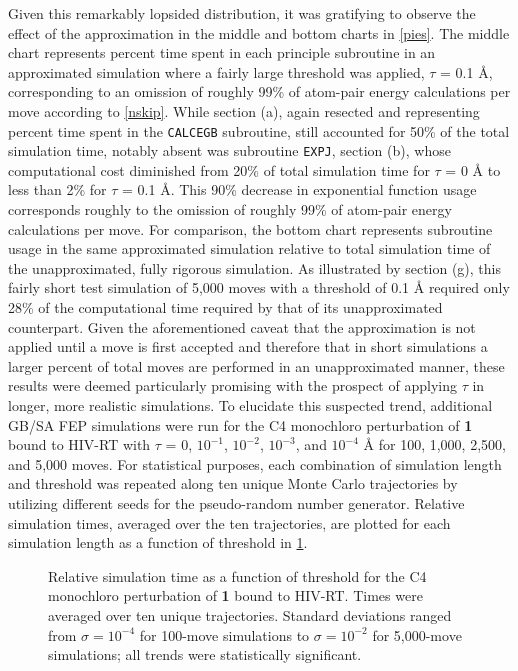 \documentclass[12pt]{report}
\begin{document}
Given this remarkably lopsided distribution, it was gratifying to observe the effect of the approximation in the middle and bottom charts in \cref{pies}. The middle chart represents percent time spent in each principle subroutine in an approximated simulation where a fairly large threshold was applied, $\tau$ = 0.1 \AA, corresponding to an omission of roughly 99\% of atom-pair energy calculations per move according to \cref{nskip}. While section (a), again resected and representing percent time spent in the {\tt CALCEGB} subroutine, still accounted for 50\% of the total simulation time, notably absent was subroutine {\tt EXPJ}, section (b), whose computational cost diminished from 20\% of total simulation time for $\tau$ = 0 \AA{} to less than 2\% for $\tau$ = 0.1 \AA. This 90\% decrease in exponential function usage corresponds roughly to the omission of roughly 99\% of atom-pair energy calculations per move. For comparison, the bottom chart represents subroutine usage in the same approximated simulation relative to total simulation time of the unapproximated, fully rigorous simulation. As illustrated by section (g), this fairly short test simulation of 5,000 moves with a threshold of 0.1 \AA{} required only 28\% of the computational time required by that of its unapproximated counterpart. Given the aforementioned caveat that the approximation is not applied until a move is first accepted and therefore that in short simulations a larger percent of total moves are performed in an unapproximated manner, these results were deemed particularly promising with the prospect of applying $\tau$ in longer, more realistic simulations. To elucidate this suspected trend, additional GB/SA FEP simulations were run for the C4 monochloro perturbation of \textbf{1} bound to HIV-RT with $\tau$ = 0, $10^{-1}$, $10^{-2}$, $10^{-3}$, and $10^{-4}$ \AA{} for 100, 1,000, 2,500, and 5,000 moves. For statistical purposes, each combination of simulation length and threshold was repeated along ten unique Monte Carlo trajectories by utilizing different seeds for the pseudo-random number generator. Relative simulation times, averaged over the ten trajectories, are plotted for each simulation length as a function of threshold in \cref{speedup}.

\begin{figure}[t]
\centering

\caption{Relative simulation time as a function of threshold for the C4 monochloro perturbation of \textbf{1} bound to HIV-RT. Times were averaged over ten unique trajectories. Standard deviations ranged from $\sigma = 10^{-4}$ for 100-move simulations to $\sigma = 10^{-2}$ for 5,000-move simulations; all trends were statistically significant.}
\label{speedup}
\end{figure}
\end{document}
